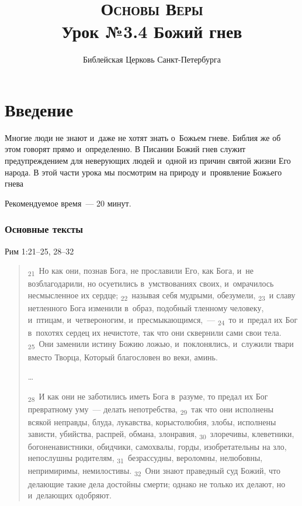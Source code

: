 \documentclass[a4paper,12pt]{article}
\title{\textsc{Основы Веры}\\Урок №3.4 Божий гнев}
\author{Библейская Церковь Санкт-Петербурга}
\date{}
\begin{document}
\maketitle

\thispagestyle{empty}

\tableofcontents



\section*{Введение}

Многие люди не знают и~даже не хотят знать о~Божьем гневе. Библия же об этом говорят прямо и~определенно. В Писании Божий гнев служит предупреждением для неверующих людей и~одной из причин святой жизни Его народа. В этой части урока мы посмотрим на природу и~проявление Божьего гнева

Рекомендуемое время~--- 20 минут.
        
\subsubsection*{Основные тексты}

Рим 1:21--25, 28--32

\begin{quote}
\textsubscript{21}~Но как они, познав Бога, не прославили Его, как Бога, и~не возблагодарили, но осуетились в~умствованиях своих, и~омрачилось несмысленное их сердце; 
\textsubscript{22}~называя себя мудрыми, обезумели, 
\textsubscript{23}~и славу нетленного Бога изменили в~образ, подобный тленному человеку, и~птицам, и~четвероногим, и~пресмыкающимся,~--- 
\textsubscript{24}~то и~предал их Бог в~похотях сердец их нечистоте, так что они сквернили сами свои тела. 
\textsubscript{25}~Они заменили истину Божию ложью, и~поклонялись, и~служили твари вместо Творца, Который благословен во веки, аминь. 

\ldots

\textsubscript{28}~И как они не заботились иметь Бога в~разуме, то предал их Бог превратному уму~--- делать непотребства, 
\textsubscript{29}~так что они исполнены всякой неправды, блуда, лукавства, корыстолюбия, злобы, исполнены зависти, убийства, распрей, обмана, злонравия, 
\textsubscript{30}~злоречивы, клеветники, богоненавистники, обидчики, самохвалы, горды, изобретательны на зло, непослушны родителям, 
\textsubscript{31}~безрассудны, вероломны, нелюбовны, непримиримы, немилостивы. 
\textsubscript{32}~Они знают праведный суд Божий, что делающие такие дела достойны смерти; однако не только их делают, но и~делающих одобряют. 
\end{quote}
\end{document}
